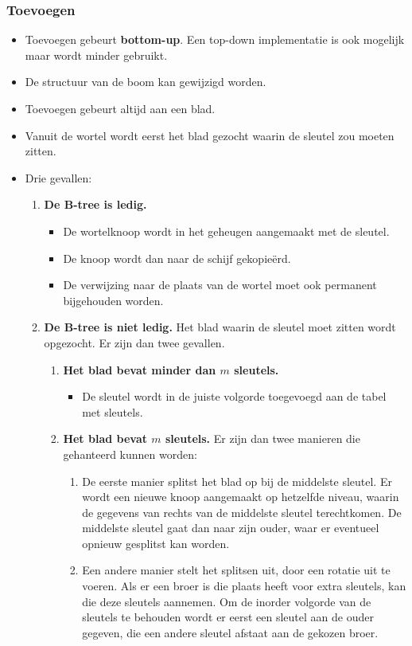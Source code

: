 \subsubsection{Toevoegen}
\begin{itemize}
    \item Toevoegen gebeurt \textbf{bottom-up}. Een top-down implementatie is ook mogelijk maar wordt minder gebruikt.
    \item De structuur van de boom kan gewijzigd worden.
    \item Toevoegen gebeurt altijd aan een blad.
    \item Vanuit de wortel wordt eerst het blad gezocht waarin de sleutel zou moeten zitten.
    \item Drie gevallen:
    \begin{enumerate}
        \item \textbf{De B-tree is ledig.}
        \begin{itemize}
            \item De wortelknoop wordt in het geheugen aangemaakt met de sleutel.
            \item De knoop wordt dan naar de schijf gekopieërd.
            \item De verwijzing naar de plaats van de wortel moet ook permanent bijgehouden worden.
        \end{itemize}
        \item \textbf{De B-tree is niet ledig.} Het blad waarin de sleutel moet zitten wordt opgezocht. Er zijn dan twee gevallen.
        \begin{enumerate}
            \item \textbf{Het blad bevat minder dan $m$ sleutels.}
            \begin{itemize}
                \item De sleutel wordt in de juiste volgorde toegevoegd aan de tabel met sleutels.
            \end{itemize}
            \item \textbf{Het blad bevat $m$ sleutels.} Er zijn dan twee manieren die gehanteerd kunnen worden:
            \begin{enumerate}
                \item De eerste manier splitst het blad op bij de middelste sleutel. Er wordt een nieuwe knoop aangemaakt op hetzelfde niveau, waarin de gegevens van rechts van de middelste sleutel terechtkomen. De middelste sleutel gaat dan naar zijn ouder, waar er eventueel opnieuw gesplitst kan worden.
                \item Een andere manier stelt het splitsen uit, door een rotatie uit te voeren. Als er een broer is die plaats heeft voor extra sleutels, kan die deze sleutels aannemen. Om de inorder volgorde van de sleutels te behouden wordt er eerst een sleutel aan de ouder gegeven, die een andere sleutel afstaat aan de gekozen broer.
            \end{enumerate}



\end{enumerate}
\end{enumerate}
\end{itemize}
